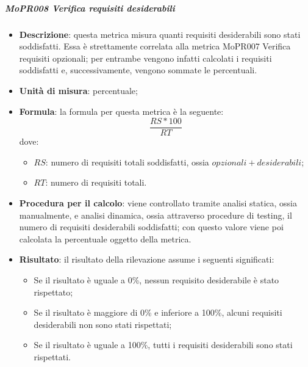 \documentclass[../norme-di-progetto.tex]{subfiles}
\begin{document}
\subparagraph{MoPR008 Verifica requisiti desiderabili}
\begin{itemize}
  \item \textbf{Descrizione}: questa metrica misura quanti requisiti desiderabili sono stati soddisfatti. Essa è strettamente correlata alla metrica MoPR007 Verifica requisiti opzionali; per entrambe vengono infatti calcolati i requisiti soddisfatti e, successivamente, vengono sommate le percentuali.
  \item \textbf{Unità di misura}: percentuale;
  \item \textbf{Formula}: la formula per questa metrica è la seguente:
  \begin{displaymath}
    \frac{RS * 100}{RT}
  \end{displaymath}
  dove:
  \begin{itemize}
    \item $ RS $: numero di requisiti totali soddisfatti, ossia $ opzionali + desiderabili $;
    \item $ RT $: numero di requisiti totali.
  \end{itemize}
    \item \textbf{Procedura per il calcolo}: viene controllato tramite analisi statica, ossia manualmente, e analisi dinamica, ossia attraverso procedure di testing, il numero di requisiti desiderabili soddisfatti; con questo valore viene poi calcolata la percentuale oggetto della metrica.
    \item \textbf{Risultato}: il risultato della rilevazione assume i seguenti significati:
    \begin{itemize}
      \item Se il risultato è uguale a 0\%, nessun requisito desiderabile è stato rispettato;
      \item Se il risultato è maggiore di 0\% e inferiore a 100\%, alcuni requisiti desiderabili non sono stati rispettati;
      \item Se il risultato è uguale a 100\%, tutti i requisiti desiderabili sono stati rispettati.
    \end{itemize}
\end{itemize}
\end{document}
